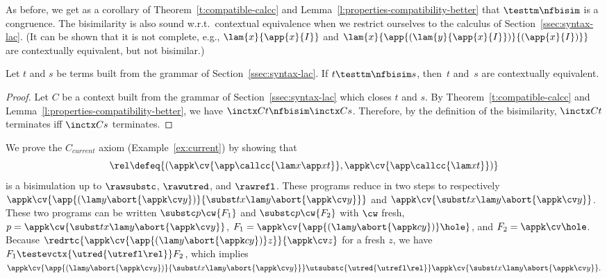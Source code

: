 \documentclass{lmcs}
\theoremstyle{defC}
\begin{document}
As before, we get as a corollary of Theorem~\ref{t:compatible-calcc}
and Lemma~\ref{l:properties-compatibility-better} that
$\testtm\nfbisim$ is a congruence. The bisimilarity is also sound
w.r.t.\ contextual equivalence when we restrict ourselves to the
calculus of Section~\ref{ssec:syntax-lac}. (It can be shown that it is
not complete, e.g., $\lam{x}{\app{x}{I}}$ and
$\lam{x}{\app{(\lam{y}{\app{x}{I}})}{(\app{x}{I})}}$ are contextually
equivalent, but not bisimilar.)
\begin{thm}%
  \label{t:soundness-callcc}
  Let $t$ and $s$ be terms built from the grammar of
  Section~\ref{ssec:syntax-lac}. If $t \testtm\nfbisim s$, then~$t$ and~$s$ are
  contextually equivalent.
\end{thm}
\begin{proof}
  Let $C$ be a context built from the grammar of Section~\ref{ssec:syntax-lac}
  which closes $t$ and $s$. By Theorem~\ref{t:compatible-calcc} and
  Lemma~\ref{l:properties-compatibility-better}, we have
  $\inctx C t \nfbisim \inctx C s$.  Therefore, by the definition of the
  bisimilarity, $\inctx C t$ terminates iff $\inctx C s$ terminates.
\end{proof}

\begin{exa}%
  \label{ex:current-upto}
  We prove the $C_{current}$ axiom (Example~\ref{ex:current}) by showing that
  \[\rel \defeq \{(\appk \cv {\app \callcc {\lam x {\app x t}}}, \appk \cv {\app
      \callcc {\lam x t}})\}\] is a bisimulation up to $\rawsubstc$,
  $\rawutred$, and $\rawrefl$. These programs reduce in two steps to
  respectively
  $\appk \cv {\app {(\lam y {\abort {\appk \cv y}})}{\subst t x {\lam y {\abort
          {\appk \cv y}}}}}$ and
  $\appk \cv {\subst t x {\lam y {\abort {\appk \cv y}}}}$. These two programs
  can be written $\substc p \cw {F_1}$ and $\substc p \cw {F_2}$ with $\cw$
  fresh, $p = \appk \cw {\subst t x {\lam y {\abort {\appk \cv y}}}}$,
  $F_1 = \appk \cv {\app{(\lam y {\abort {\appk c y}})} \hole}$, and
  $F_2 = \appk \cv \hole$. Because
  $\redrtc{\appk \cv {\app{(\lam y {\abort {\appk c y}})} z}}{\appk \cv z}$ for
  a fresh $z$, we have $F_1 \testevctx{\utred{\utrefl \rel}} F_2$, which implies
  \(\appk \cv {\app {(\lam y {\abort {\appk \cv y}})}{\subst t x {\lam y {\abort
            {\appk \cv y}}}}} \utsubstc{\utred{\utrefl \rel}}\appk \cv {\subst t x
      {\lam y {\abort {\appk \cv y}}}}. \)
\end{exa}
\end{document}
